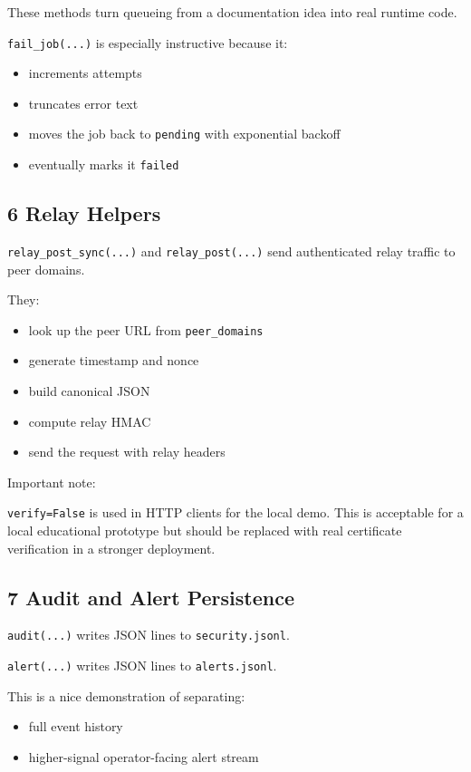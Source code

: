 \documentclass[11pt,a4paper]{article}
\begin{document}
These methods turn queueing from a documentation idea into real runtime code.

\nolinkurl{fail_job(...)} is especially instructive because it:

\begin{itemize}
\item increments attempts
\item truncates error text
\item moves the job back to \nolinkurl{pending} with exponential backoff
\item eventually marks it \nolinkurl{failed}
\end{itemize}

\subsection{6 Relay Helpers}

\nolinkurl{relay_post_sync(...)} and \nolinkurl{relay_post(...)} send authenticated relay traffic to peer domains.

They:

\begin{itemize}
\item look up the peer URL from \nolinkurl{peer_domains}
\item generate timestamp and nonce
\item build canonical JSON
\item compute relay HMAC
\item send the request with relay headers
\end{itemize}

Important note:

\nolinkurl{verify=False} is used in HTTP clients for the local demo. This is acceptable for a local educational prototype but should be replaced with real certificate verification in a stronger deployment.

\subsection{7 Audit and Alert Persistence}

\nolinkurl{audit(...)} writes JSON lines to \nolinkurl{security.jsonl}.

\nolinkurl{alert(...)} writes JSON lines to \nolinkurl{alerts.jsonl}.

This is a nice demonstration of separating:

\begin{itemize}
\item full event history
\item higher-signal operator-facing alert stream
\end{itemize}
\end{document}
